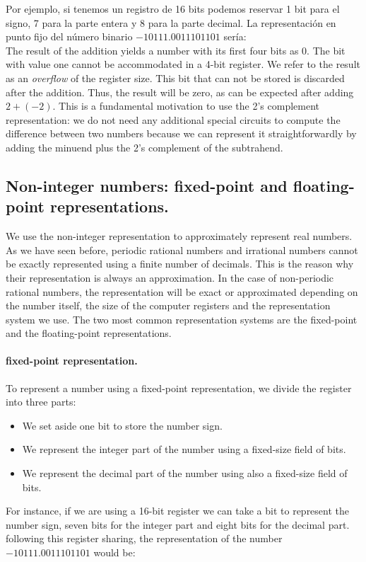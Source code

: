 \begin{paracol}{2}
Por ejemplo, si tenemos un registro de 16 bits podemos reservar 1 bit para el signo, 7 para la parte entera y 8 para la parte decimal.  La representación en punto fijo del número binario $-10111.0011101101$ sería: \\
\switchcolumn
The result of the addition yields a number with its first four bits as 0. The bit with value one cannot be accommodated in a 4-bit register. We refer to the result as an \emph{overflow} of the register size. This bit that can not be stored is discarded after the addition. Thus, the result will be zero, as can be expected after adding $2+(-2)$. This is a fundamental motivation to use the 2's complement representation: we do not need any additional special circuits to compute the difference between two numbers because we can represent it straightforwardly by adding the minuend plus the 2's complement of the subtrahend. 
\subsection{Non-integer numbers: fixed-point and floating-point representations.}We use the non-integer representation to approximately represent real numbers. As we have seen before, periodic rational numbers and irrational numbers cannot be exactly represented using a finite number of decimals. This is the reason why their representation is always an approximation. In the case of non-periodic rational numbers, the representation will be exact or approximated depending on the number itself, the size of the computer registers and the representation system we use. The two most common representation systems are the fixed-point and the floating-point representations.   \paragraph{fixed-point representation.} To represent a number using a fixed-point representation, we divide the register into three parts:
\begin{itemize}
    \item We set aside one bit to store the number sign.
    \item We represent the integer part of the number using a fixed-size field of bits.
    \item We represent the decimal part of the number using also a fixed-size field of bits. 
 \end{itemize}
 For instance, if we are using a 16-bit register we can take a bit to represent the number sign, seven bits for the integer part and eight bits for the decimal part. following this register sharing, the representation of the number $-10111.0011101101$ would be:\\ 
\end{paracol}
